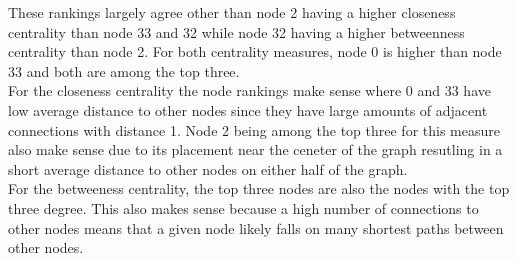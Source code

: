 \documentclass{article}
\begin{document}
\begin{enumerate}[label=(\alph*), left=10pt, itemsep=10pt]
\begin{minipage}[t]{0.9\textwidth}
            These rankings largely agree other than node 2 having a higher closeness centrality
            than node 33 and 32 while node 32 having a higher betweenness centrality than node 2.
            For both centrality measures, node 0 is higher than node 33 and both are among the
            top three.\\

            For the closeness centrality the node rankings make sense where 0 and 33 have
            low average distance to other nodes since they have large amounts of adjacent connections
            with distance 1. Node 2 being among the top three for this measure also make sense
            due to its placement near the ceneter of the graph resutling in a short average
            distance to other nodes on either half of the graph.\\

            For the betweeness centrality, the top three nodes are also the nodes with the top
            three degree. This also makes sense because a high number of connections to other
            nodes means that a given node likely falls on many shortest paths between other
            nodes.
        \end{minipage}


\end{enumerate}
\end{document}
